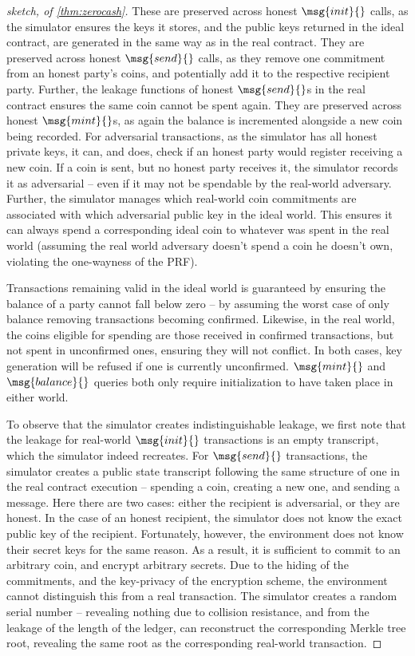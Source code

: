 \begin{proof}[sketch, of \autoref{thm:zerocash}]
  These are preserved across honest $\msg{init}{}$ calls, as the simulator
  ensures the keys it stores, and the public keys returned in the ideal
  contract, are generated in the same way as in the real contract. They are
  preserved across honest $\msg{send}{}$ calls, as they remove one commitment
  from an honest party's coins, and potentially add it to the respective
  recipient party. Further, the leakage functions of honest $\msg{send}{}$s in
  the real contract ensures the same coin cannot be spent again. They are
  preserved across honest $\msg{mint}{}$s, as again the balance is incremented
  alongside a new coin being recorded. For adversarial transactions, as the
  simulator has all honest private keys, it can, and does, check if an honest
  party would register receiving a new coin. If a coin is sent, but no honest
  party receives it, the simulator records it as adversarial -- even if it may
  not be spendable by the real-world adversary. Further, the simulator manages
  which real-world coin commitments are associated with which adversarial public
  key in the ideal world. This ensures it can always spend a corresponding ideal
  coin to whatever was spent in the real world (assuming the real world
  adversary doesn't spend a coin he doesn't own, violating the one-wayness of
  the PRF).

  Transactions remaining valid in the ideal world is guaranteed by ensuring the
  balance of a party cannot fall below zero -- by assuming the worst case of
  only balance removing transactions becoming confirmed. Likewise, in the real
  world, the coins eligible for spending are those received in confirmed
  transactions, but not spent in unconfirmed ones, ensuring they will not
  conflict. In both cases, key generation will be refused if one is currently
  unconfirmed. $\msg{mint}{}$ and $\msg{balance}{}$ queries both only require
  initialization to have taken place in either world.

  To observe that the simulator creates indistinguishable leakage, we first note
  that the leakage for real-world $\msg{init}{}$ transactions is an empty
  transcript, which the simulator indeed recreates. For $\msg{send}{}$
  transactions, the simulator creates a public state transcript following the
  same structure of one in the real contract execution -- spending a coin,
  creating a new one, and sending a message. Here there are two cases: either
  the recipient is adversarial, or they are honest. In the case of an honest
  recipient, the simulator does not know the exact public key of the recipient.
  Fortunately, however, the environment does not know their secret keys for the
  same reason. As a result, it is sufficient to commit to an arbitrary coin, and
  encrypt arbitrary secrets. Due to the hiding of the commitments, and the
  key-privacy of the encryption scheme, the environment cannot distinguish this
  from a real transaction. The simulator creates a random serial number --
  revealing nothing due to collision resistance, and from the leakage of the
  length of the ledger, can reconstruct the corresponding Merkle tree root,
  revealing the same root as the corresponding real-world transaction.


\end{proof}

